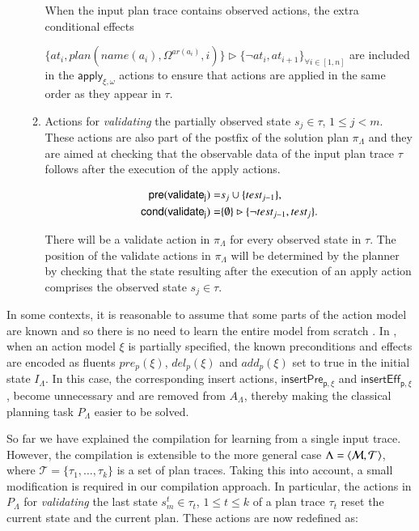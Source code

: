 \begin{itemize}
\begin{enumerate}
When the input plan trace contains observed actions, the extra conditional effects

$\{at_{i},plan(name(a_i),\Omega^{ar(a_i)},i)\}\rhd\{\neg at_{i},at_{i+1}\}_{\forall i\in [1,n]}$ are included in the $\mathsf{apply_{\xi,\omega}}$ actions to ensure that actions are applied in the same order as they appear in $\tau$.\\

\item Actions for {\em validating} the partially observed state $s_j\in\tau$, {\tt\small $1\leq j< m$}. These actions are also part of the postfix of the solution plan $\pi_\Lambda$ and they are aimed at checking that the observable data of the input plan trace $\tau$ follows after the execution of the apply actions.

\begin{small}
\begin{align*}
\hspace*{7pt}\mathsf{pre}(\mathsf{validate_{j}})=&s_j\cup\{test_{j-1}\},\\
\mathsf{cond}(\mathsf{validate_{j}})=&\{\emptyset\}\rhd\{\neg test_{j-1}, test_j\}.
\end{align*}
\end{small}

\textcolor[rgb]{1.00,0.00,0.00}{There will be a validate action in $\pi_\Lambda$ for every observed state in $\tau$. The position of the validate actions in $\pi_\Lambda$ will be determined by the planner by checking that the state resulting after the execution of an apply action comprises the observed state $s_j\in\tau$.}

\end{enumerate}
\end{itemize}


In some contexts, it is reasonable to assume that some parts of the action model are known and so there is no need to learn the entire model from scratch \cite{ZhuoNK13}. In \FAMA, when an action model $\xi$ is partially specified, the known preconditions and effects are encoded as fluents $pre_p(\xi)$, $del_p(\xi)$ and $add_p(\xi)$ set to true in the initial state $I_{\Lambda}$. In this case, the corresponding insert actions, $\mathsf{insertPre_{p,\xi}}$ and $\mathsf{insertEff_{p,\xi}}$, become unnecessary and are removed from $A_{\Lambda}$, thereby making the classical planning task $P_{\Lambda}$ easier to be solved.

So far we have explained the compilation for learning from a single input trace. However, the compilation is extensible to the more general case $\Lambda={\langle \mathcal{M},\mathcal{T} \rangle}$, where $\mathcal{T}=\{\tau_1,\ldots,\tau_k\}$ is a set of plan traces. Taking this into account, a small modification is required in our compilation approach. In particular, the actions in $P_{\Lambda}$ for {\em validating} the last state $s_m^t\in \tau_t$, {\tt\small $1\leq t\leq k$} of a plan trace $\tau_t$ reset the current state and the current plan. These actions are now redefined as:


